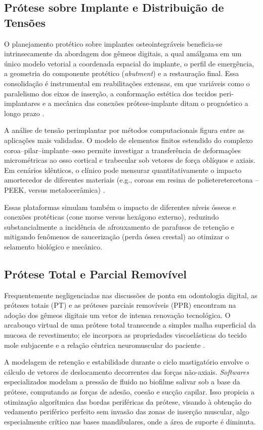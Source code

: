 \subsection{Prótese sobre Implante e Distribuição de Tensões}

O planejamento protético sobre implantes osteointegráveis beneficia-se intrinsecamente da abordagem dos gêmeos digitais, a qual amálgama em um único modelo vetorial a coordenada espacial do implante, o perfil de emergência, a geometria do componente protético (\textit{abutment}) e a restauração final. Essa consolidação é instrumental em reabilitações extensas, em que variáveis como o paralelismo dos eixos de inserção, a conformação estética dos tecidos peri-implantares e a mecânica das conexões prótese-implante ditam o prognóstico a longo prazo \cite{shen2024effectiveness}.

A análise de tensão perimplantar por métodos computacionais figura entre as aplicações mais validadas. O modelo de elementos finitos estendido do complexo coroa--pilar--implante--osso permite investigar a transferência de deformações micrométricas ao osso cortical e trabecular sob vetores de força oblíquos e axiais. Em cenários idênticos, o clínico pode mensurar quantitativamente o impacto amortecedor de diferentes materiais (e.g., coroas em resina de polieteretercetona -- PEEK, versus metalocerâmica) \cite{menon2026innovations}.

Essas plataformas simulam também o impacto de diferentes níveis ósseos e conexões protéticas (cone morse versus hexágono externo), reduzindo substancialmente a incidência de afrouxamento de parafusos de retenção e mitigando fenômenos de saucerização (perda óssea crestal) ao otimizar o selamento biológico e mecânico.

\subsection{Prótese Total e Parcial Removível}

Frequentemente negligenciadas nas discussões de ponta em odontologia digital, as próteses totais (PT) e as próteses parciais removíveis (PPR) encontram na adoção dos gêmeos digitais um vetor de intensa renovação tecnológica. O arcabouço virtual de uma prótese total transcende a simples malha superficial da mucosa de revestimento; ele incorpora as propriedades viscoelásticas do tecido mole subjacente e a relação cêntrica neuromuscular do paciente \cite{olawade2026advancing}.

A modelagem de retenção e estabilidade durante o ciclo mastigatório envolve o cálculo de vetores de deslocamento decorrentes das forças não-axiais. \textit{Softwares} especializados modelam a pressão de fluido no biofilme salivar sob a base da prótese, computando as forças de adesão, coesão e sucção capilar. Isso propicia a otimização algorítmica das bordas periféricas da prótese, visando à obtenção do vedamento periférico perfeito sem invasão das zonas de inserção muscular, algo especialmente crítico nas bases mandibulares, onde a área de suporte é diminuta.

